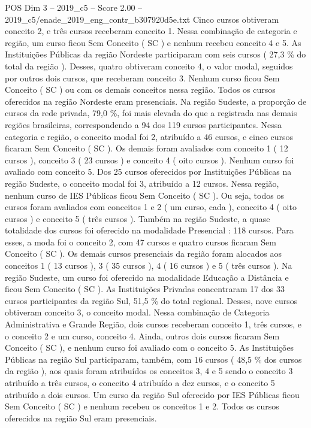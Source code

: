 \begin{textsample}{POS Dim 3 – 2019\_c5 – Score 2.00 – 2019\_c5/enade\_2019\_eng\_contr\_b307920d5e.txt}
Cinco cursos obtiveram conceito 2, e três cursos receberam conceito 1.
Nessa combinação de categoria e região, um curso ficou Sem Conceito ( SC ) e nenhum recebeu conceito 4 e 5.
As Instituições Públicas da região Nordeste participaram com seis cursos ( 27,3 \% do total da região ).
Desses, quatro obtiveram conceito 4, o valor modal, seguidos por outros dois cursos, que receberam conceito 3.
Nenhum curso ficou Sem Conceito ( SC ) ou com os demais conceitos nessa região.
Todos os cursos oferecidos na região Nordeste eram presenciais.
Na região Sudeste, a proporção de cursos da rede privada, 79,0 \%, foi mais elevada do que a registrada nas demais regiões brasileiras, correspondendo a 94 dos 119 cursos participantes.
Nessa categoria e região, o conceito modal foi 2, atribuído a 46 cursos, e cinco cursos ficaram Sem Conceito ( SC ).
Os demais foram avaliados com conceito 1 ( 12 cursos ), conceito 3 ( 23 cursos ) e conceito 4 ( oito cursos ).
Nenhum curso foi avaliado com conceito 5.
Dos 25 cursos oferecidos por Instituições Públicas na região Sudeste, o conceito modal foi 3, atribuído a 12 cursos.
Nessa região, nenhum curso de IES Públicas ficou Sem Conceito ( SC ).
Ou seja, todos os cursos foram avaliados com conceitos 1 e 2 ( um curso, cada ), conceito 4 ( oito cursos ) e conceito 5 ( três cursos ).
Também na região Sudeste, a quase totalidade dos cursos foi oferecido na modalidade Presencial : 118 cursos.
Para esses, a moda foi o conceito 2, com 47 cursos e quatro cursos ficaram Sem Conceito ( SC ).
Os demais cursos presenciais da região foram alocados aos conceitos 1 ( 13 cursos ), 3 ( 35 cursos ), 4 ( 16 cursos ) e 5 ( três cursos ).
Na região Sudeste, um curso foi oferecido na modalidade Educação a Distância e ficou Sem Conceito ( SC ).
As Instituições Privadas concentraram 17 dos 33 cursos participantes da região Sul, 51,5 \% do total regional.
Desses, nove cursos obtiveram conceito 3, o conceito modal.
Nessa combinação de Categoria Administrativa e Grande Região, dois cursos receberam conceito 1, três cursos, e o conceito 2 e um curso, conceito 4.
Ainda, outros dois cursos ficaram Sem Conceito ( SC ), e nenhum curso foi avaliado com o conceito 5.
As Instituições Públicas na região Sul participaram, também, com 16 cursos ( 48,5 \% dos cursos da região ), aos quais foram atribuídos os conceitos 3, 4 e 5 sendo o conceito 3 atribuído a três cursos, o conceito 4 atribuído a dez cursos, e o conceito 5 atribuído a dois cursos.
Um curso da região Sul oferecido por IES Públicas ficou Sem Conceito ( SC ) e nenhum recebeu os conceitos 1 e 2.
Todos os cursos oferecidos na região Sul eram presenciais.

\end{textsample}
